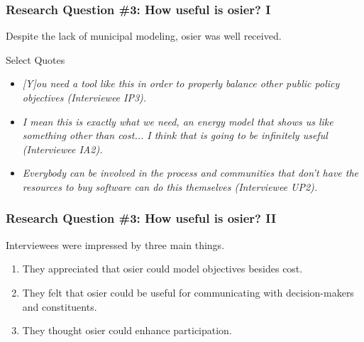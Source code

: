 \begin{frame}
    \frametitle{Research Question \#3: How useful is \gls{osier}? I}

    Despite the lack of municipal modeling, \gls{osier} was well received.

    \begin{block}{Select Quotes}
        \begin{itemize}
            \item   \textit{[Y]ou need a tool like this in order to properly balance other
                        public policy objectives (Interviewee IP3).}  
            \item \textit{I mean this is exactly what we need, an energy model that shows us
                        like something other than cost... I think that is going to be infinitely
                        useful (Interviewee IA2).}
            \item \textit{Everybody can be involved in the process and communities that don’t
                        have the resources to buy software can do this themselves (Interviewee UP2).}
        \end{itemize}
    \end{block}
\end{frame}

\begin{frame}
    \frametitle{Research Question \#3: How useful is \gls{osier}? II}
    Interviewees were impressed by three main things. 
    \begin{enumerate}[<+->]
        \item They appreciated that \gls{osier} could model objectives besides cost.
        \item They felt that \gls{osier} could be useful for communicating with decision-makers and constituents.
        \item They thought \gls{osier} could enhance participation.
    \end{enumerate}
    
\end{frame}

